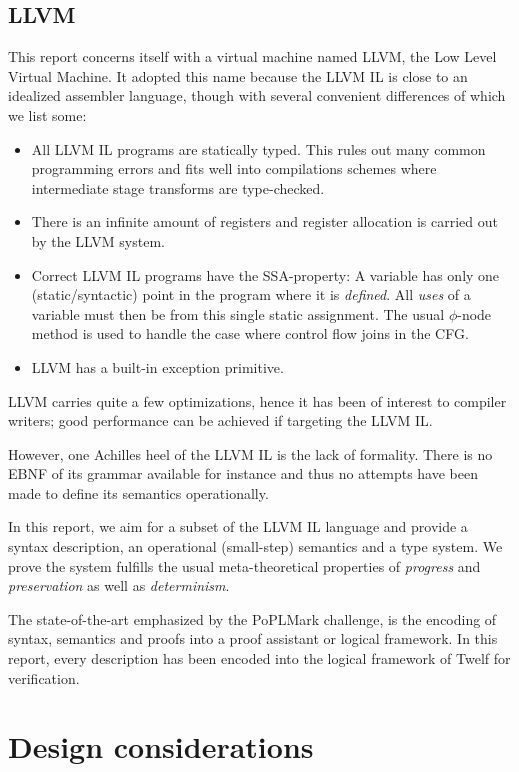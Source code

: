 \documentclass[a4paper, oneside, 10pt, draft]{memoir}
\begin{document}
\section{LLVM}

This report concerns itself with a virtual machine named LLVM, the Low
Level Virtual Machine. It adopted this name because the LLVM IL is
close to an idealized assembler language, though with several
convenient differences of which we list some:
\begin{itemize}
\item All LLVM IL programs are statically typed. This rules out many
  common programming errors and fits well into compilations schemes
  where intermediate stage transforms are type-checked.
\item There is an infinite amount of registers and register allocation
  is carried out by the LLVM system.
\item Correct LLVM IL programs have the SSA-property: A variable has
  only one (static/syntactic) point in the program where it is
  \emph{defined}. All \emph{uses} of a variable must then be from this
  single static assignment. The usual $\phi$-node method is used to
  handle the case where control flow joins in the CFG.
\item LLVM has a built-in exception primitive.
\end{itemize}

LLVM carries quite a few optimizations, hence it has been of interest
to compiler writers; good performance can be achieved if targeting the
LLVM IL.

However, one Achilles heel of the LLVM IL is the lack of
formality. There is no EBNF of its grammar available for instance and
thus no attempts have been made to define its semantics operationally.

In this report, we aim for a subset of the LLVM IL language and
provide a syntax description, an operational (small-step) semantics and a type
system. We prove the system fulfills the usual meta-theoretical
properties of \emph{progress} and \emph{preservation} as well as
\emph{determinism}.

The state-of-the-art emphasized by the PoPLMark challenge,
is the encoding of syntax, semantics and proofs into a proof assistant
or logical framework. In this report, every description has been
encoded into the logical framework of Twelf for
verification.

\chapter{Design considerations}



\end{document}
